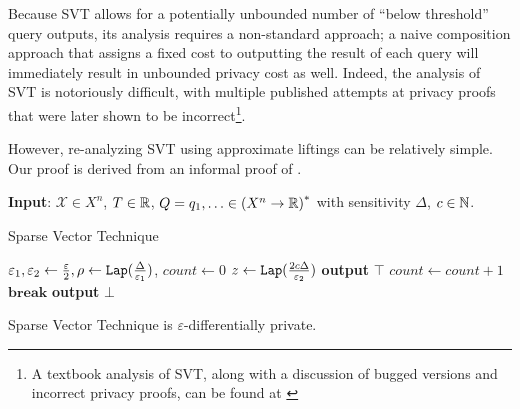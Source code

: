 Because SVT allows for a potentially unbounded number of ``below threshold'' query outputs, its analysis requires a non-standard approach; a naive composition approach that assigns a fixed cost to outputting the result of each query will immediately result in unbounded privacy cost as well. 
Indeed, the analysis of SVT is notoriously difficult, with multiple published attempts at privacy proofs that were later shown to be incorrect\footnote{A textbook analysis of SVT, along with a discussion of bugged versions and incorrect privacy proofs, can be found at \cite{10.14778/3055330.3055331}}. 

However, re-analyzing SVT using approximate liftings can be relatively simple. Our proof is derived from an informal proof of \cite{BartheEtAl2016}.

\begin{algorithm}
    \hspace*{\algorithmicindent}\textbf{Input}: $\mathcal{X}\in X^n$, $T\in \mathbb{R}$, $Q=q_1, \ldots \in {(X^n\to \mathbb{R})}^*$ with sensitivity $\Delta$, $c\in \mathbb{N}$.
    \begin{algorithmic}[1]
        \caption{Sparse Vector Technique}\label{couplingAlg}
        \State $\varepsilon_1, \varepsilon_2 \gets \frac{\varepsilon}{2},
        \rho \gets \texttt{Lap}(\frac{\Delta}{\varepsilon_1})$, $count \gets 0$
			\State $z\gets \texttt{Lap}(\frac{2c\Delta}{\varepsilon_2})$
                \State\textbf{output} $\top$
                \State$count\gets count+1$
                    \State$\textbf{break}$
                \EndIf
            \Else
                \State\textbf{output} $\bot$
            \EndIf
		\EndFor
    \end{algorithmic}
\end{algorithm}


\begin{thm}
    Sparse Vector Technique is $\varepsilon$-differentially private. 
\end{thm}

